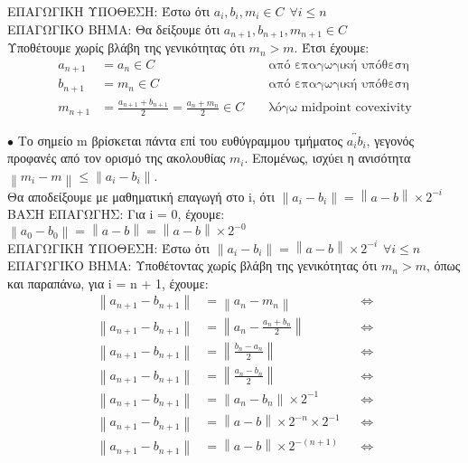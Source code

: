 \documentclass[12pt]{article}
\newcommand{\norm}[1]{\left\lVert#1\right\rVert}
\newcommand{\margin}{\hspace{5pt}}
\begin{document}
ΕΠΑΓΩΓΙΚΗ ΥΠΟΘΕΣΗ: Έστω ότι $a_i, b_i, m_i \in C \margin \forall i \leq n$ \\

ΕΠΑΓΩΓΙΚΟ ΒΗΜΑ: Θα δείξουμε ότι $a_{n + 1}, b_{n + 1}, m_{n + 1} \in C$ \\

Υποθέτουμε χωρίς βλάβη της γενικότητας ότι $m_n > m$. Έτσι έχουμε: \\

\begin{align*}
    a_{n + 1} & = a_n \in C && \text{ από επαγωγική υπόθεση}\\
    b_{n + 1} & = m_n \in C && \text{ από επαγωγική υπόθεση} \\
    m_{n + 1} & = \frac{a_{n + 1} + b_{n + 1}}{2} = \frac{a_n + m_n}{2} \in C && \text{ λόγω midpoint covexivity}
\end{align*}

$\bullet$ Το σημείο m βρίσκεται πάντα επί του ευθύγραμμου τμήματος $\overleftrightarrow{a_{i}b_{i}}$,
γεγονός προφανές από τον ορισμό της ακολουθίας $m_i$.
Επομένως, ισχύει η ανισότητα $\norm{m_i - m} \leq \norm{a_i - b_i}$. \\

Θα αποδείξουμε με μαθηματική επαγωγή στο i, ότι $\norm{a_i - b_i} = \norm{a - b} \times 2^{-i}$\\

ΒΑΣΗ ΕΠΑΓΩΓΗΣ: Για i = 0, έχουμε: $\norm{a_0 - b_0} = \norm{a - b} = \norm{a - b} \times 2^{-0}$\\

ΕΠΑΓΩΓΙΚΗ ΥΠΟΘΕΣΗ: Έστω ότι $\norm{a_i - b_i} = \norm{a - b} \times 2^{-i} \margin \forall i \leq n$\\

ΕΠΑΓΩΓΙΚΟ ΒΗΜΑ: Υποθέτοντας χωρίς βλάβη της γενικότητας ότι $m_n > m$,
όπως και παραπάνω, για i = n + 1, έχουμε:\\

\begin{align*}
    \norm{a_{n + 1} - b_{n + 1}} & = \norm{a_n - m_n} && \Leftrightarrow \\
    \norm{a_{n + 1} - b_{n + 1}} & = \norm{a_n - \frac{a_n + b_n}{2}} && \Leftrightarrow \\
    \norm{a_{n + 1} - b_{n + 1}} & = \norm{\frac{b_n - a_n}{2}} && \Leftrightarrow \\
    \norm{a_{n + 1} - b_{n + 1}} & = \norm{\frac{a_n - b_n}{2}} && \Leftrightarrow \\
    \norm{a_{n + 1} - b_{n + 1}} & = \norm{a_n - b_n} \times {2^{-1}} && \Leftrightarrow \\
    \norm{a_{n + 1} - b_{n + 1}} & = \norm{a - b} \times 2^{-n} \times {2^{-1}} && \Leftrightarrow \\
    \norm{a_{n + 1} - b_{n + 1}} & = \norm{a - b} \times 2^{-(n + 1)} && \Leftrightarrow
\end{align*}\\
\end{document}
